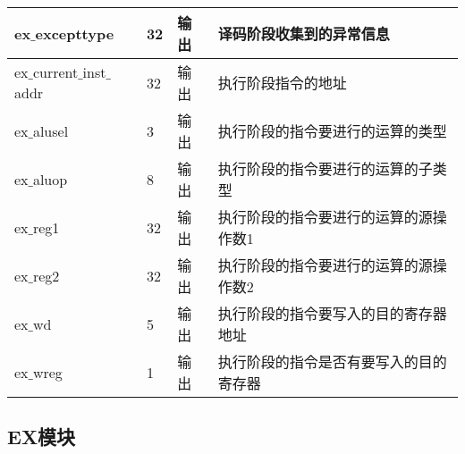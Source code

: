 \begin{table}[H]
\begin{tabular}{|l|l|l|l|}
		\hline
		ex$\_$excepttype & 32 & 输出 & 译码阶段收集到的异常信息 \\
		\hline
		ex$\_$current$\_$inst$\_$addr & 32 & 输出 & 执行阶段指令的地址 \\
		\hline
		ex$\_$alusel & 3 & 输出 & 执行阶段的指令要进行的运算的类型 \\
		\hline
		ex$\_$aluop & 8 & 输出 & 执行阶段的指令要进行的运算的子类型 \\
		\hline
		ex$\_$reg1 & 32 & 输出 & 执行阶段的指令要进行的运算的源操作数1 \\
		\hline
		ex$\_$reg2 & 32 & 输出 & 执行阶段的指令要进行的运算的源操作数2 \\
		\hline
		ex$\_$wd & 5 & 输出 & 执行阶段的指令要写入的目的寄存器地址 \\
		\hline
		ex$\_$wreg & 1 & 输出 & 执行阶段的指令是否有要写入的目的寄存器 \\
		\hline
	\end{tabular}
\end{table}
\subsection{EX模块}
